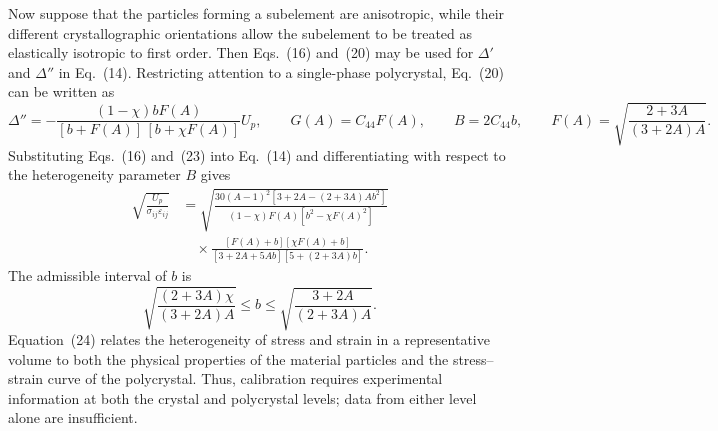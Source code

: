 Now suppose that the particles forming a subelement are anisotropic, while their different crystallographic orientations allow the subelement to be treated as elastically isotropic to first order. Then Eqs.~(16) and~(20) may be used for $\Delta'$ and $\Delta''$ in Eq.~(14). Restricting attention to a single-phase polycrystal, Eq.~(20) can be written as
\begin{equation}
 \Delta''
 =-\frac{(1-\chi)bF(A)}{[b+F(A)]\,[b+\chi F(A)]}U_p,
 \qquad
 G(A)=C_{44}F(A),
 \qquad
 B=2C_{44}b,
 \qquad
 F(A)=\sqrt{\frac{2+3A}{(3+2A)A}}.
\end{equation}
Substituting Eqs.~(16) and~(23) into Eq.~(14) and differentiating with respect to the heterogeneity parameter $B$ gives
\begin{equation}
\begin{aligned}
 \sqrt{\frac{U_p}{\sigma_{ij}\varepsilon_{ij}}}
 &={}
 \sqrt{
 \frac{30(A-1)^2[3+2A-(2+3A)Ab^2]}
 {(1-\chi)F(A)[b^2-\chi F(A)^2]}}
 \\
 &\quad\times
 \frac{[F(A)+b][\chi F(A)+b]}
 {[3+2A+5Ab][5+(2+3A)b]}.
\end{aligned}
\end{equation}
The admissible interval of $b$ is
\begin{equation}
 \sqrt{\frac{(2+3A)\chi}{(3+2A)A}}
 \leq b\leq
 \sqrt{\frac{3+2A}{(2+3A)A}}.
\end{equation}
Equation~(24) relates the heterogeneity of stress and strain in a representative volume to both the physical properties of the material particles and the stress--strain curve of the polycrystal. Thus, calibration requires experimental information at both the crystal and polycrystal levels; data from either level alone are insufficient.


